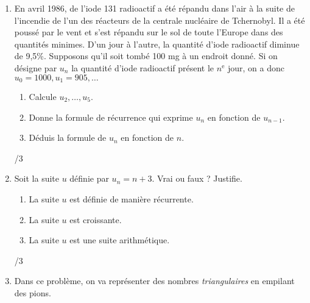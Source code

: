 	\begin{enumerate}
		\item 
			\begin{minipage}[t]{.9\textwidth}
				En avril 1986, de l'iode 131 radioactif a été répandu dans l'air à la suite de l'incendie de l'un des réacteurs de la centrale nucléaire de Tchernobyl.
				Il a été poussé par le vent et s'est répandu sur le sol de toute l'Europe dans des quantités minimes.
				D'un jour à l'autre, la quantité d'iode radioactif diminue de 9,5\%.
				Supposons qu'il soit tombé 100 mg à un endroit donné. Si on désigne par $u_n$ la quantité d'iode radioactif présent le $n^{\text{e}}$ jour, on a donc $u_0 = 1000, u_1 = 905,\dots$
				\begin{enumerate}
					\item Calcule $u_2, \dots, u_5$.
					\item Donne la formule de récurrence qui exprime $u_n$ en fonction de $u_{n-1}$.
					\item Déduis la formule de $u_n$ en fonction de $n$.
				\end{enumerate}
			\end{minipage}%
			\begin{minipage}{.1\textwidth}
				\begin{flushright}
					{\large /3}
				\end{flushright}
			\end{minipage}
			\vspace{1em}
			
		\item 
			\begin{minipage}[t]{.9\textwidth}
				Soit la suite $u$ définie par $u_n = n +3$. Vrai ou faux ? Justifie.
				\begin{enumerate}
					\item La suite $u$ est définie de manière récurrente.
					\item La suite $u$ est croissante.
					\item La suite $u$ est une suite arithmétique.
				\end{enumerate}
			\end{minipage}%
			\begin{minipage}{.1\textwidth}
				\begin{flushright}
					{\large /3}
				\end{flushright}
			\end{minipage}
			\vspace{1em}
			
		\item 
			\begin{minipage}[t]{.9\textwidth}
				Dans ce problème, on va représenter des nombres \textit{triangulaires} en empilant des pions.
				\begin{center}
\end{center}
\end{minipage}
\end{enumerate}
